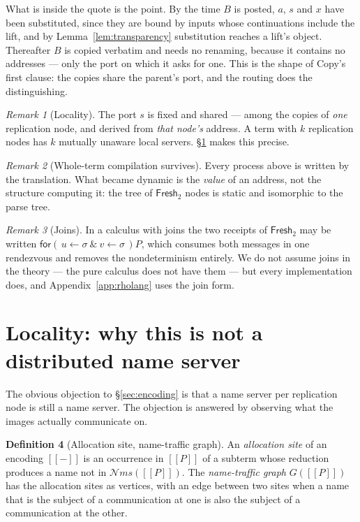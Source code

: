 \documentclass[11pt]{article}
\theoremstyle{definition}
\newtheorem{definition}{Definition}[section]
\theoremstyle{plain}
\theoremstyle{remark}
\newtheorem{remark}[definition]{Remark}
\newcommand{\inpp}[5]{\mathsf{for}(\,#1 \leftarrow #2\ \&\ #3 \leftarrow #4\,)#5}
\newcommand{\enc}[1]{[\![#1]\!]}
\newcommand{\Frsh}{\mathsf{Fresh}_2}
\newcommand{\nms}{\mathcal{N}\!\mathit{ms}}
\begin{document}
What is inside the quote is the point. By the time $B$ is posted, $a$,
$s$ and $x$ have been substituted, since they are bound by inputs whose
continuations include the lift, and by Lemma~\ref{lem:transparency}
substitution reaches a lift's object. Thereafter $B$ is copied verbatim
and needs no renaming, because it contains no addresses --- only the port
on which it asks for one. This is the shape of Copy's first clause: the
copies share the parent's port, and the routing does the distinguishing.

\begin{remark}[Locality]
The port $s$ is fixed and shared --- among the copies of \emph{one}
replication node, and derived from \emph{that node's} address. A term
with $k$ replication nodes has $k$ mutually unaware local servers.
\S\ref{sec:locality} makes this precise.
\end{remark}

\begin{remark}[Whole-term compilation survives]
Every process above is written by the translation. What became dynamic is
the \emph{value} of an address, not the structure computing it: the tree
of $\Frsh$ nodes is static and isomorphic to the parse tree.
\end{remark}

\begin{remark}[Joins]\label{rem:joins}
In a calculus with joins the two receipts of $\Frsh$ may be written
$\inpp{u}{\sigma}{v}{\sigma}{P}$, which consumes both messages in one
rendezvous and removes the nondeterminism entirely. We do not assume
joins in the theory --- the pure calculus does not have them --- but every
implementation does, and Appendix~\ref{app:rholang} uses the join form.
\end{remark}

\section{Locality: why this is not a distributed name server}
\label{sec:locality}

The obvious objection to \S\ref{sec:encoding} is that a name server per
replication node is still a name server. The objection is answered by
observing what the images actually communicate on.

\begin{definition}[Allocation site, name-traffic graph]
An \emph{allocation site} of an encoding $\enc{-}$ is an occurrence in
$\enc{P}$ of a subterm whose reduction produces a name not in
$\nms(\enc{P})$. The \emph{name-traffic graph} $G(\enc{P})$ has the
allocation sites as vertices, with an edge between two sites when a name
that is the subject of a communication at one is also the subject of a
communication at the other.
\end{definition}
\end{document}
